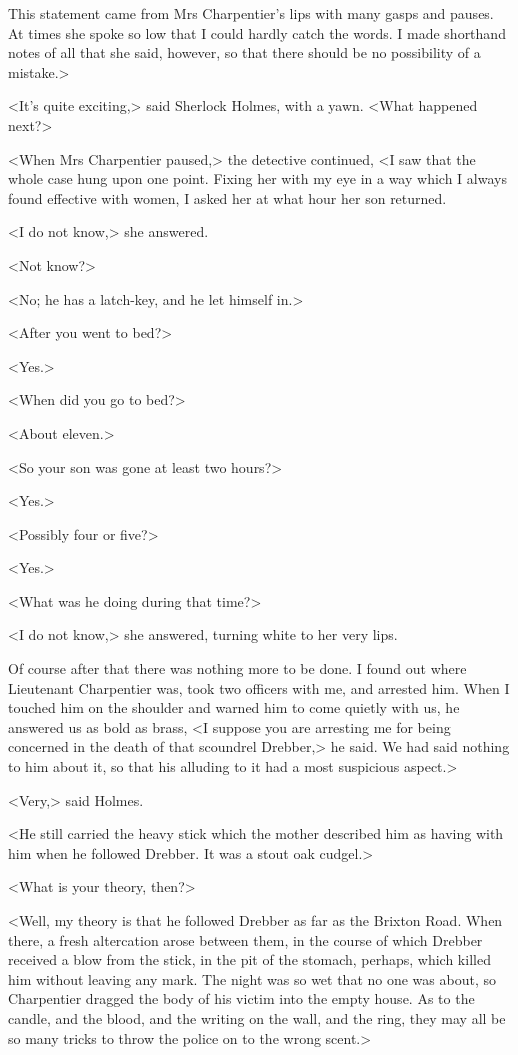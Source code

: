This statement came from Mrs Charpentier's lips with many gasps and pauses. At times she spoke so low that I could hardly catch the words. I made shorthand notes of all that she said, however, so that there should be no possibility of a mistake.>

<It's quite exciting,> said Sherlock Holmes, with a yawn. <What happened next?>

<When Mrs Charpentier paused,> the detective continued, <I saw that the whole case hung upon one point. Fixing her with my eye in a way which I always found effective with women, I asked her at what hour her son returned.

<I do not know,> she answered.

<Not know?>

<No; he has a latch-key, and he let himself in.>

<After you went to bed?>

<Yes.>

<When did you go to bed?>

<About eleven.>

<So your son was gone at least two hours?>

<Yes.>

<Possibly four or five?>

<Yes.>

<What was he doing during that time?>

<I do not know,> she answered, turning white to her very lips.

Of course after that there was nothing more to be done. I found out where Lieutenant Charpentier was, took two officers with me, and arrested him. When I touched him on the shoulder and warned him to come quietly with us, he answered us as bold as brass, <I suppose you are arresting me for being concerned in the death of that scoundrel Drebber,> he said. We had said nothing to him about it, so that his alluding to it had a most suspicious aspect.>

<Very,> said Holmes.

<He still carried the heavy stick which the mother described him as having with him when he followed Drebber. It was a stout oak cudgel.>

<What is your theory, then?>

<Well, my theory is that he followed Drebber as far as the Brixton Road. When there, a fresh altercation arose between them, in the course of which Drebber received a blow from the stick, in the pit of the stomach, perhaps, which killed him without leaving any mark. The night was so wet that no one was about, so Charpentier dragged the body of his victim into the empty house. As to the candle, and the blood, and the writing on the wall, and the ring, they may all be so many tricks to throw the police on to the wrong scent.>

